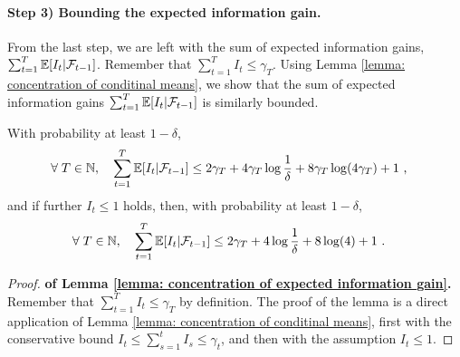 \paragraph{Step 3) Bounding the expected information gain.}
From the last step, we are left with the sum of expected information gains, $\sum_{t=1}^T \mathbb{E}[I_t|\mathcal{F}_{t-1}]$. Remember that $\sum_{t=1}^T I_t \leq \gamma_T$. Using Lemma \ref{lemma: concentration of conditinal means}, we show that the sum of expected information gains $\sum_{t=1}^T \mathbb{E}[I_t|\mathcal{F}_{t-1}]$ is similarly bounded.

\begin{lemma}\label{lemma: concentration of expected information gain}
	With probability at least $1-\delta$,
	\begin{align*}
	\forall\; T \in \mathbb{N}, \quad \sum_{t=1}^T \mathbb{E}[I_t|\mathcal{F}_{t-1}] &\leq 2\gamma_T + 4 \gamma_T \log \frac{1}{\delta} + 8 \gamma_T \log(4\gamma_T) + 1 \text{ ,}
	\end{align*}
	and if further $I_t \leq 1$ holds, then, with probability at least $1-\delta$,
	\begin{align*}
	\forall\; T \in \mathbb{N}, \quad\sum_{t=1}^T \mathbb{E}[I_t|\mathcal{F}_{t-1}] &\leq 2\gamma_T + 4 \log \frac{1}{\delta} + 8 \log(4) + 1\text{ .}
	\end{align*}
\end{lemma}

\begin{proof}\textbf{of Lemma \ref{lemma: concentration of expected information gain}.} Remember that $\sum_{t=1}^T I_t \leq \gamma_T$ by definition. The proof of the lemma is a direct application of Lemma \ref{lemma: concentration of conditinal means}, first with the conservative bound $I_t \leq \sum_{s=1}^t I_s \leq \gamma_t$, and then with the assumption $I_t \leq 1$.
\end{proof}


